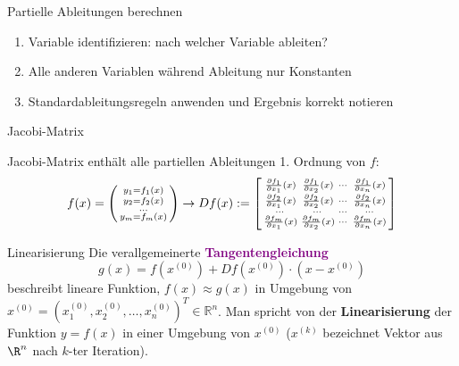 \begin{KR}{Partielle Ableitungen berechnen}
    \small
    \begin{enumerate}
        \item Variable identifizieren: nach welcher Variable ableiten?
        \item Alle anderen Variablen während Ableitung nur Konstanten
        \item Standardableitungsregeln anwenden und Ergebnis korrekt notieren
    \end{enumerate}
\end{KR}

\begin{definition}{Jacobi-Matrix}

Jacobi-Matrix enthält alle partiellen Ableitungen 1. Ordnung von $f$:
\vspace{-2mm}\\
$$f(x) = \begin{psmallmatrix}
    y_1=f_1(x) \\
    y_2=f_2(x) \\
    ...\\
    y_m=f_m(x)
\end{psmallmatrix} \rightarrow 
Df(x) := \begin{bsmallmatrix}
\frac{\partial f_1}{\partial x_1}(x) & \frac{\partial f_1}{\partial x_2}(x) & \cdots & \frac{\partial f_1}{\partial x_n}(x) \\
\frac{\partial f_2}{\partial x_1}(x) & \frac{\partial f_2}{\partial x_2}(x) & \cdots & \frac{\partial f_2}{\partial x_n}(x) \\
\cdots & \cdots & \cdots & \cdots \\
\frac{\partial f_m}{\partial x_1}(x) & \frac{\partial f_m}{\partial x_2}(x) & \cdots & \frac{\partial f_m}{\partial x_n}(x)
\end{bsmallmatrix}$$
\end{definition}

\begin{concept}{Linearisierung}
Die verallgemeinerte \textcolor{purple}{\textbf{Tangentengleichung}}
$$g(x) = f(x^{(0)}) + Df(x^{(0)}) \cdot (x - x^{(0)})$$ 
\small
beschreibt lineare Funktion, $f(x) \approx g(x)$ in Umgebung von $x^{(0)}=(x_1^{(0)}, x_2^{(0)}, \ldots, x_n^{(0)})^T \in \mathbb{R}^n$. 
Man spricht von der \textbf{Linearisierung} der Funktion $y = f(x)$ in einer Umgebung von $x^{(0)}$ ($x^{(k)}$ bezeichnet Vektor aus $\R^n$ nach $k$-ter Iteration).
\end{concept}


